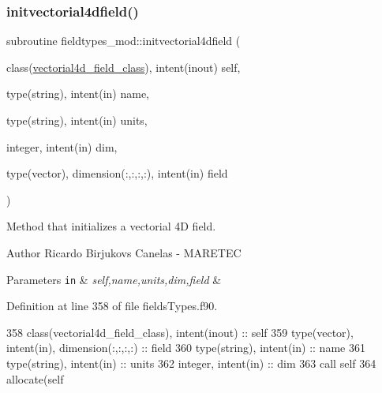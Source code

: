 \subsubsection{\texorpdfstring{initvectorial4dfield()}{initvectorial4dfield()}}
{\footnotesize\ttfamily subroutine fieldtypes\+\_\+mod\+::initvectorial4dfield (\begin{DoxyParamCaption}\item[{class(\mbox{\hyperlink{structfieldtypes__mod_1_1vectorial4d__field__class}{vectorial4d\+\_\+field\+\_\+class}}), intent(inout)}]{self,  }\item[{type(string), intent(in)}]{name,  }\item[{type(string), intent(in)}]{units,  }\item[{integer, intent(in)}]{dim,  }\item[{type(vector), dimension(\+:,\+:,\+:,\+:), intent(in)}]{field }\end{DoxyParamCaption})\hspace{0.3cm}{\ttfamily [private]}}



Method that initializes a vectorial 4D field. 

\begin{DoxyAuthor}{Author}
Ricardo Birjukovs Canelas -\/ M\+A\+R\+E\+T\+EC 
\end{DoxyAuthor}

\begin{DoxyParams}[1]{Parameters}
\mbox{\tt in}  & {\em self,name,units,dim,field} & \\
\hline
\end{DoxyParams}


Definition at line 358 of file fields\+Types.\+f90.


\begin{DoxyCode}
358     \textcolor{keywordtype}{class}(vectorial4d\_field\_class), \textcolor{keywordtype}{intent(inout)} :: self
359     \textcolor{keywordtype}{type}(vector), \textcolor{keywordtype}{intent(in)}, \textcolor{keywordtype}{dimension(:,:,:,:)} :: field
360     \textcolor{keywordtype}{type}(string), \textcolor{keywordtype}{intent(in)} :: name
361     \textcolor{keywordtype}{type}(string), \textcolor{keywordtype}{intent(in)} :: units
362     \textcolor{keywordtype}{integer}, \textcolor{keywordtype}{intent(in)} :: dim
363     \textcolor{keyword}{call }self%
364     \textcolor{keyword}{allocate}(self%
\end{DoxyCode}
\mbox{\label{namespacefieldtypes__mod_a5a556fba603c1d39b20713fdbc813332}} 
